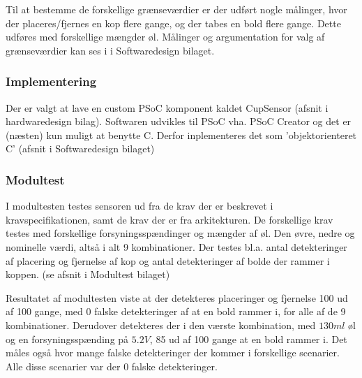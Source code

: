 \documentclass[Rapport/Rapport_main.tex]{subfiles}
\begin{document}
Til at bestemme de forskellige grænseværdier er der udført nogle målinger, hvor der placeres/fjernes en kop flere gange, og der tabes en bold flere gange. Dette udføres med forskellige mængder øl. Målinger og argumentation for valg af grænseværdier kan ses i  i Softwaredesign bilaget. 

 

\subsubsection{Implementering}\label{sec:CupSensorImplementering}
Der er valgt at lave en custom PSoC komponent kaldet CupSensor (afsnit  i hardwaredesign bilag). Softwaren udvikles til PSoC vha. PSoC Creator og det er (næsten) kun muligt at benytte C. Derfor inplementeres det som 'objektorienteret C' (afsnit  i Softwaredesign bilaget)

\subsubsection{Modultest}
I modultesten testes sensoren ud fra de krav der er beskrevet i kravspecifikationen, samt de krav der er fra arkitekturen. De forskellige krav testes med forskellige forsyningsspændinger og mængder af øl. Den øvre, nedre og nominelle værdi, altså i alt 9 kombinationer. Der testes bl.a. antal detekteringer af placering og fjernelse af kop og antal detekteringer af bolde der rammer i koppen. (se afsnit  i Modultest bilaget)

Resultatet af modultesten viste at der detekteres placeringer og fjernelse 100 ud af 100 gange, med 0 falske detekteringer af at en bold rammer i, for alle af de 9 kombinationer. Derudover detekteres der i den værste kombination, med $130\si{ml}$ øl og en forsyningsspænding på $5.2\si{V}$, 85 ud af 100 gange at en bold rammer i. Det måles også hvor mange falske detekteringer der kommer i forskellige scenarier. Alle disse scenarier var der 0 falske detekteringer.
\end{document}
